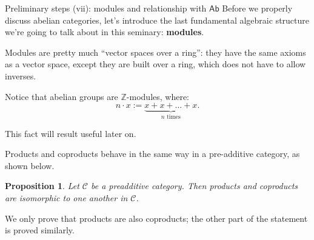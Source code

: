 \documentclass{beamer}
\newtheorem{proposition}{Proposition}
\newcommand{\ZZ}{\mathbb{Z}}
\newcommand{\cat}[1]{\mathsf{#1}}
\begin{document}
\begin{frame}{Preliminary steps (vii): modules and relationship with $\cat{Ab}$}
    Before we properly discuss abelian categories, let's introduce
    the last fundamental algebraic structure we're going to talk about
    in this seminary: \textbf{modules}. \medskip
    
    Modules are pretty much ``vector spaces over a ring'': they have the
    same axioms as a vector space, except they are built over a ring,
    which does not have to allow inverses. \medskip

    Notice that abelian groups are $\ZZ$-modules, where:
    \[
        n \cdot x := \underbrace{x + x + \ldots + x}_{n \text{ times}}.
    \]

    This fact will result useful later on.
\end{frame}

\begin{frame}
    Products and coproducts behave in the same way in a
    pre-additive category, as shown below. \smallskip

    \begin{proposition}
        Let $\mathcal{C}$ be a preadditive category. Then
        products and coproducts are isomorphic to one
        another in $\mathcal{C}$.
    \end{proposition}

    We only prove that products are also coproducts; the other part of
    the statement is proved similarly.
\end{frame}
\end{document}
